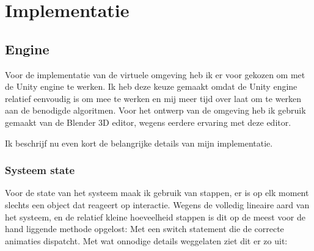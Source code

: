 \section{Implementatie}
\subsection{Engine}
Voor de implementatie van de virtuele omgeving heb ik er voor gekozen om met de
Unity engine te werken. Ik heb deze keuze gemaakt omdat de Unity engine relatief
eenvoudig is om mee te werken en mij meer tijd over laat om te werken aan de
benodigde algoritmen. Voor het ontwerp van de omgeving heb ik gebruik gemaakt 
van de Blender 3D editor, wegens eerdere ervaring met deze editor.

Ik beschrijf nu even kort de belangrijke details van mijn implementatie.


\subsubsection{Systeem state}
Voor de state van het systeem maak ik gebruik van stappen, er is op elk moment
slechts een object dat reageert op interactie. Wegens de volledig lineaire aard
van het systeem, en de relatief kleine hoeveelheid stappen is dit op de meest 
voor de hand liggende methode opgelost: Met een switch statement die de correcte
animaties dispatcht. Met wat onnodige details weggelaten ziet dit er zo uit:


